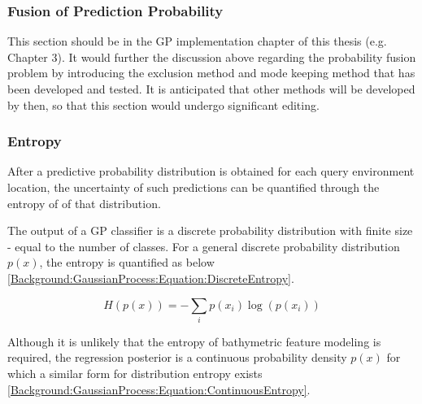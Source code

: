			\subsubsection{Fusion of Prediction Probability}

				{\color{BurntOrange} This section should be in the GP implementation chapter of this thesis (e.g. Chapter 3). It would further the discussion above regarding the probability fusion problem by introducing the exclusion method and mode keeping method that has been developed and tested. It is anticipated that other methods will be developed by then, so that this section would undergo significant editing.}
				
				
				
		
			\subsubsection{Entropy}
			
				After a predictive probability distribution is obtained for each query environment location, the uncertainty of such predictions can be quantified through the entropy of of that distribution.
				
				The output of a GP classifier is a discrete probability distribution with finite size - equal to the number of classes. For a general discrete probability distribution $p(x)$, the entropy is quantified as below \eqref{Background:GaussianProcess:Equation:DiscreteEntropy}.
				
				\begin{equation}
					H(p(x)) = - \sum_{i} p(x_{i}) \log(p(x_{i}))
				\label{Background:GaussianProcess:Equation:DiscreteEntropy}
				\end{equation}
				
				Although it is unlikely that the entropy of bathymetric feature modeling is required, the regression posterior is a continuous probability density $p(x)$ for which a similar form for distribution entropy exists \eqref{Background:GaussianProcess:Equation:ContinuousEntropy}.
				

